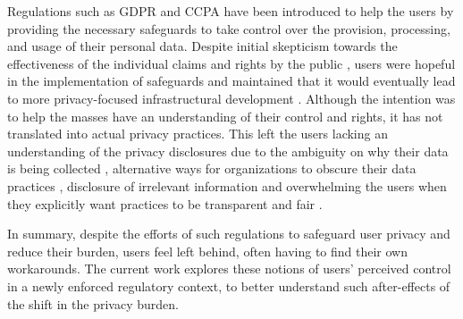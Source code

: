 Regulations such as GDPR and CCPA have been introduced to help the users by providing the necessary safeguards to take control over the provision, processing, and usage of their personal data. Despite initial skepticism towards the effectiveness of the individual claims and rights by the public \cite{strycharz_data_2020}, users were hopeful in the implementation of safeguards and maintained that it would eventually lead to more privacy-focused infrastructural development \cite{mangini_empirical_2020}. Although the intention was to help the masses have an understanding of their control and rights, it has not translated into actual privacy practices. This left the users lacking an understanding of the privacy disclosures due to the ambiguity on why their data is being collected \cite{chen_fighting_2021}, alternative ways for organizations to obscure their data practices \cite{oconnor_clear_2021}, disclosure of irrelevant information and overwhelming the users when they explicitly want practices to be transparent and fair \cite{kyi_it_2024}. 

In summary, despite the efforts of such regulations to safeguard user privacy and reduce their burden, users feel left behind, often having to find their own workarounds. The current work explores these notions of users' perceived control in a newly enforced regulatory context, to better understand such after-effects of the shift in the privacy burden. 

